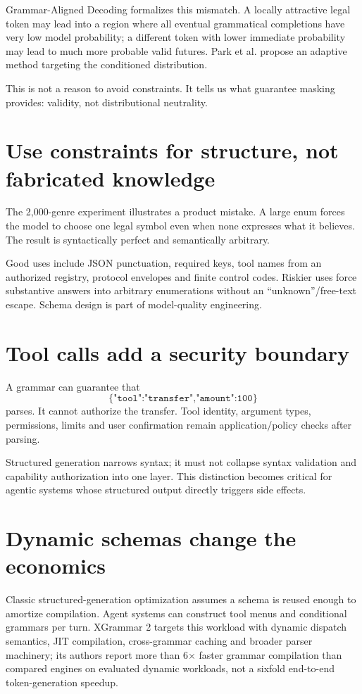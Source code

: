 Grammar-Aligned Decoding formalizes this mismatch. A locally attractive legal token
may lead into a region where all eventual grammatical completions have very low model
probability; a different token with lower immediate probability may lead to much more
probable valid futures. Park et al. propose an adaptive method targeting the
conditioned distribution. \cite{park2024gad}

This is not a reason to avoid constraints. It tells us what guarantee masking provides:
validity, not distributional neutrality.

\section{Use constraints for structure, not fabricated knowledge}

The 2,000-genre experiment illustrates a product mistake. A large enum forces the
model to choose one legal symbol even when none expresses what it believes. The result
is syntactically perfect and semantically arbitrary.

Good uses include JSON punctuation, required keys, tool names from an authorized
registry, protocol envelopes and finite control codes. Riskier uses force substantive
answers into arbitrary enumerations without an ``unknown''/free-text escape. Schema
design is part of model-quality engineering.

\section{Tool calls add a security boundary}

A grammar can guarantee that
\[
\{\texttt{"tool":"transfer","amount":100}\}
\]
parses. It cannot authorize the transfer. Tool identity, argument types, permissions,
limits and user confirmation remain application/policy checks after parsing.

Structured generation narrows syntax; it must not collapse syntax validation and
capability authorization into one layer. This distinction becomes critical for
agentic systems whose structured output directly triggers side effects.

\section{Dynamic schemas change the economics}

Classic structured-generation optimization assumes a schema is reused enough to
amortize compilation. Agent systems can construct tool menus and conditional grammars
per turn. XGrammar 2 targets this workload with dynamic dispatch semantics, JIT
compilation, cross-grammar caching and broader parser machinery; its authors report
more than 6$\times$ faster grammar compilation than compared engines on
evaluated dynamic workloads, not a sixfold end-to-end token-generation speedup.
\cite{li2026xgrammar2}

